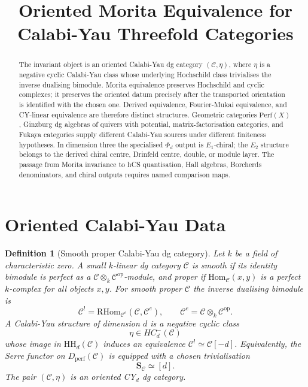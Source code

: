 \documentclass[11pt]{amsart}
\newtheorem{definition}[theorem]{Definition}
\newcommand{\HH}{\mathrm{HH}}
\newcommand{\Perf}{\mathrm{Perf}}
\newcommand{\Dperf}{D_{\mathrm{perf}}}
\newcommand{\Hom}{\mathrm{Hom}}
\newcommand{\Ser}{\mathbf{S}}
\newcommand{\cC}{\mathcal{C}}
\newcommand{\op}{\mathrm{op}}
\begin{document}
\title{Oriented Morita Equivalence for Calabi-Yau Threefold Categories}
\author{}
\date{}
\maketitle

\begin{abstract}
The invariant object is an oriented Calabi-Yau dg category
$(\cC,\eta)$, where $\eta$ is a negative cyclic Calabi-Yau class whose
underlying Hochschild class trivialises the inverse dualising bimodule.
Morita equivalence preserves Hochschild and cyclic complexes; it
preserves the oriented datum precisely after the transported orientation
is identified with the chosen one.  Derived equivalence, Fourier-Mukai
equivalence, and CY-linear equivalence are therefore distinct structures.
Geometric categories $\Perf(X)$, Ginzburg dg algebras of quivers with
potential, matrix-factorisation categories, and Fukaya categories supply
different Calabi-Yau sources under different finiteness hypotheses.  In
dimension three the specialised $\Phi_d$ output is $E_1$-chiral; the
$E_2$ structure belongs to the derived chiral centre, Drinfeld centre,
double, or module layer.  The passage from Morita invariance to hCS
quantisation, Hall algebras, Borcherds denominators, and chiral outputs
requires named comparison maps.
\end{abstract}

\tableofcontents

\section{Oriented Calabi-Yau Data}

\begin{definition}[Smooth proper Calabi-Yau dg category]
Let $k$ be a field of characteristic zero.  A small $k$-linear dg
category $\cC$ is smooth if its identity bimodule is perfect as a
$\cC \otimes_k \cC^{\op}$-module, and proper if
$\Hom_\cC(x,y)$ is a perfect $k$-complex for all objects $x,y$.
For smooth proper $\cC$ the inverse dualising bimodule is
\[
  \cC^{!} = \mathrm{RHom}_{\cC^e}(\cC,\cC^e),
  \qquad \cC^e=\cC\otimes_k\cC^{\op}.
\]
A Calabi-Yau structure of dimension $d$ is a negative cyclic class
\[
  \eta\in HC^-_d(\cC)
\]
whose image in $\HH_d(\cC)$ induces an equivalence
$\cC^{!}\simeq \cC[-d]$.  Equivalently, the Serre functor on
$\Dperf(\cC)$ is equipped with a chosen trivialisation
\[
  \Ser_\cC \simeq [d].
\]
The pair $(\cC,\eta)$ is an oriented CY$_d$ dg category.
\end{definition}
\end{document}
